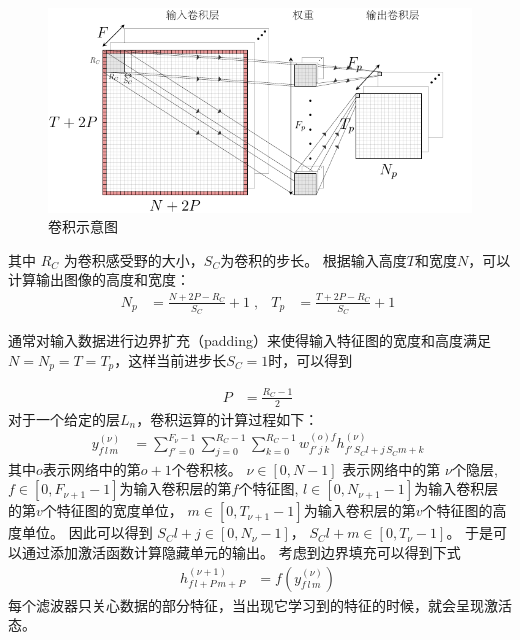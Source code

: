 
\begin{figure}[!t]
	\centering
  \includegraphics[width=\textwidth]{figures/networks/conv}
	\caption{卷积示意图}
	\label{fig:conv}
\end{figure}

其中 $R_C$ 为卷积感受野的大小，$S_C$为卷积的步长。
根据输入高度$ T $和宽度$ N $，可以计算输出图像的高度和宽度：
\begin{align}
  N_p&=\frac{N+2P-R_C}{S_C}+1 \;,&
  T_p&=\frac{T+2P-R_C}{S_C}+1\;
\end{align}

通常对输入数据进行边界扩充（padding）来使得输入特征图的宽度和高度满足$ N = N_p = T = T_p $，这样当前进步长$ S_C = 1 $时，可以得到

\begin{align}
P&=\frac{R_C-1}{2}\;
\end{align}
对于一个给定的层$ L_n $，卷积运算的计算过程如下：
\begin{align}
y_{f\,l\,m}^{(\nu)}&=\sum^{F_\nu-1}_{f'=0}\sum^{R_C-1}_{j=0}\sum^{R_C-1}_{k=0}
%
w^{(o)f}_{f'\,j\,k}h^{(\nu)}_{f'\,S_Cl+j\,S_Cm+k}\;
\end{align}
其中$ o $表示网络中的第$ o + 1 $个卷积核。
$\nu \in [0,N-1 ]$ 表示网络中的第 $\nu$个隐层, $f\in[0,F_{\nu+1}-1]$为输入卷积层的第$f$个特征图, $l\in[0,N_{\nu+1}-1 ]$为输入卷积层的第$v$个特征图的宽度单位， $m\in[0,T_{\nu+1}-1 ]$为输入卷积层的第$v$个特征图的高度单位。 因此可以得到 $S_Cl+j\in[0,N_\nu-1 ]$， $S_Cl+m\in[0,T_\nu-1 ]$。 于是可以通过添加激活函数计算隐藏单元的输出。
考虑到边界填充可以得到下式
\begin{align}
h_{f\,l+P\,m+P}^{(\nu+1)}&=f\left(y_{f\,l\,m}^{(\nu)}\right)\;
\end{align}
每个滤波器只关心数据的部分特征，当出现它学习到的特征的时候，就会呈现激活态。

